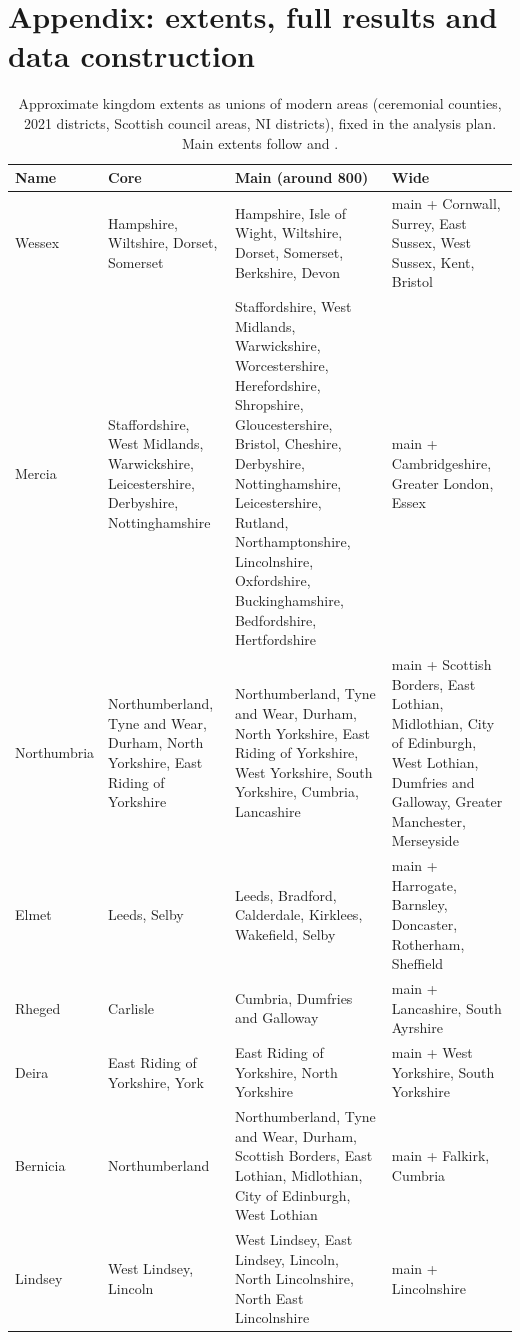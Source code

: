 \documentclass[11pt,a4paper]{article}
\begin{document}
\appendix
\section{Appendix: extents, full results and data construction}
\begin{table}[tbp]\centering\scriptsize\caption{Approximate kingdom extents as unions of modern areas (ceremonial counties, 2021 districts, Scottish council areas, NI districts), fixed in the analysis plan. Main extents follow \citet{hill1981} and \citet{yorke1990}.}\label{tab:ext}\begin{tabular}{p{1.7cm}p{3.4cm}p{6.2cm}p{3.6cm}}\toprule Name & Core & Main (around 800) & Wide\\\midrule
Wessex & Hampshire, Wiltshire, Dorset, Somerset & Hampshire, Isle of Wight, Wiltshire, Dorset, Somerset, Berkshire, Devon & main + Cornwall, Surrey, East Sussex, West Sussex, Kent, Bristol\\
Mercia & Staffordshire, West Midlands, Warwickshire, Leicestershire, Derbyshire, Nottinghamshire & Staffordshire, West Midlands, Warwickshire, Worcestershire, Herefordshire, Shropshire, Gloucestershire, Bristol, Cheshire, Derbyshire, Nottinghamshire, Leicestershire, Rutland, Northamptonshire, Lincolnshire, Oxfordshire, Buckinghamshire, Bedfordshire, Hertfordshire & main + Cambridgeshire, Greater London, Essex\\
Northumbria & Northumberland, Tyne and Wear, Durham, North Yorkshire, East Riding of Yorkshire & Northumberland, Tyne and Wear, Durham, North Yorkshire, East Riding of Yorkshire, West Yorkshire, South Yorkshire, Cumbria, Lancashire & main + Scottish Borders, East Lothian, Midlothian, City of Edinburgh, West Lothian, Dumfries and Galloway, Greater Manchester, Merseyside\\
Elmet & Leeds, Selby & Leeds, Bradford, Calderdale, Kirklees, Wakefield, Selby & main + Harrogate, Barnsley, Doncaster, Rotherham, Sheffield\\
Rheged & Carlisle & Cumbria, Dumfries and Galloway & main + Lancashire, South Ayrshire\\
Deira & East Riding of Yorkshire, York & East Riding of Yorkshire, North Yorkshire & main + West Yorkshire, South Yorkshire\\
Bernicia & Northumberland & Northumberland, Tyne and Wear, Durham, Scottish Borders, East Lothian, Midlothian, City of Edinburgh, West Lothian & main + Falkirk, Cumbria\\
Lindsey & West Lindsey, Lincoln & West Lindsey, East Lindsey, Lincoln, North Lincolnshire, North East Lincolnshire & main + Lincolnshire\\

\end{tabular}
\end{table}
\end{document}
